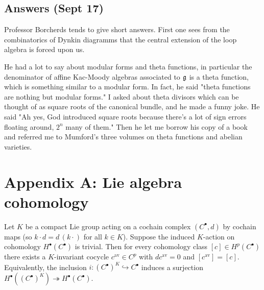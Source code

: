 \documentclass[12pt]{article}
\begin{document}
\subsection*{Answers (Sept 17)}
Professor Borcherds tends to give short answers. First one sees from the combinatorics of Dynkin diagramms that the central extension of the loop algebra is forced upon us. 

He had a lot to say about modular forms and theta functions, in particular the denominator of affine Kac-Moody algebras associated to $\mathfrak{g}$ is a theta function, which is something similar to a modular form. In fact, he said "theta functions are nothing but modular forms." I asked about theta divisors which can be thought of as square roots of the canonical bundle, and he made a funny joke. He said "Ah yes, God introduced square roots because there's a lot of sign errors floating around, $2^n$ many of them." Then he let me borrow his copy of a book and referred me to Mumford's three volumes on theta functions and abelian varieties.
\section{Appendix A: Lie algebra cohomology}

\begin{lemma}\label{lem:invariant-representative}
    Let $K$ be a compact Lie group acting on a cochain complex $(C^\bullet,d)$ by
    cochain maps (so $k\cdot d = d\,(k\cdot)$ for all $k\in K$). Suppose the induced
    $K$-action on cohomology $H^\bullet(C^\bullet)$ is trivial. Then for every
    cohomology class $[c]\in H^p(C^\bullet)$ there exists a $K$-invariant cocycle
    $c^{\mathrm{av}}\in C^p$ with $dc^{\mathrm{av}}=0$ and $[c^{\mathrm{av}}]=[c]$.
    Equivalently, the inclusion $i:(C^\bullet)^K\hookrightarrow C^\bullet$
    induces a surjection $H^\bullet((C^\bullet)^K)\twoheadrightarrow H^\bullet(C^\bullet)$.
\end{lemma}
\end{document}

